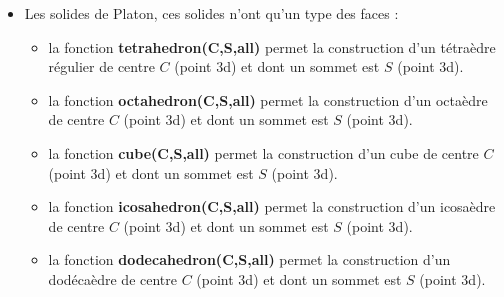 \begin{itemize}
    \item Les solides de Platon, ces solides n'ont qu'un type des faces :
        \begin{itemize}
            \item  la fonction \textbf{tetrahedron(C,S,all)} permet la construction d'un tétraèdre régulier de centre $C$ (point 3d) et dont un sommet est $S$ (point 3d).
            \item la fonction \textbf{octahedron(C,S,all)} permet la construction d'un octaèdre de centre $C$ (point 3d) et dont un sommet est $S$ (point 3d).
            \item la fonction \textbf{cube(C,S,all)} permet la construction d'un cube de centre $C$ (point 3d) et dont un sommet est $S$ (point 3d).
            \item la fonction \textbf{icosahedron(C,S,all)} permet la construction d'un icosaèdre de centre $C$ (point 3d) et dont un sommet est $S$ (point 3d).
            \item la fonction \textbf{dodecahedron(C,S,all)} permet la construction d'un dodécaèdre de centre $C$ (point 3d) et dont un sommet est $S$ (point 3d).
        \end{itemize}


\end{itemize}
